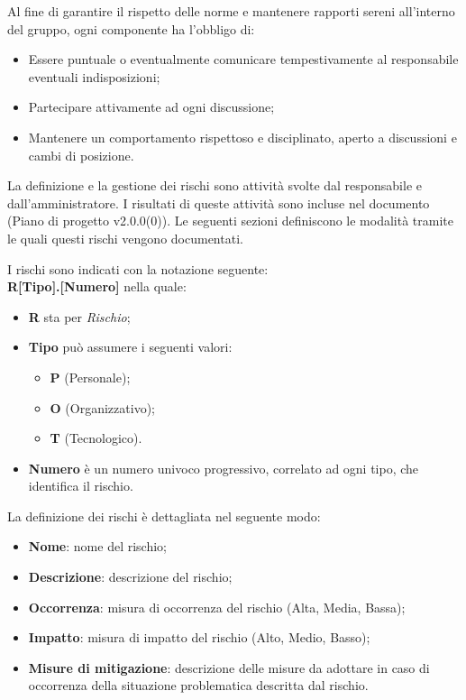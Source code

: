 \documentclass[10pt, a4paper]{article}
\begin{document}
Al fine di garantire il rispetto delle norme e mantenere rapporti sereni all'interno del gruppo, ogni componente ha l'obbligo di:
\begin{itemize}
    \item Essere puntuale o eventualmente comunicare tempestivamente al responsabile eventuali indisposizioni;
    \item Partecipare attivamente ad ogni discussione;
    \item Mantenere un comportamento rispettoso e disciplinato, aperto a discussioni e cambi di posizione.
\end{itemize}

La definizione e la gestione dei rischi sono attività svolte dal responsabile e dall'amministratore.
I risultati di queste attività sono incluse nel documento (Piano di progetto v2.0.0(0)).
Le seguenti sezioni definiscono le modalità tramite le quali questi rischi vengono documentati.

I rischi sono indicati con la notazione seguente:\\
\textbf{R[Tipo].[Numero]}
nella quale:
\begin{itemize}
\item \textbf{R} sta per \textit{Rischio};
\item \textbf{Tipo} può assumere i seguenti valori:
    \begin{itemize}
	\item \textbf{P} (Personale);
	\item \textbf{O} (Organizzativo);
	\item \textbf{T} (Tecnologico).
    \end{itemize}
\item \textbf{Numero} è un numero univoco progressivo, correlato ad ogni tipo, che identifica il rischio.
\end{itemize}

La definizione dei rischi è dettagliata nel seguente modo:
\begin{itemize}
    \item \textbf{Nome}: nome del rischio;
    \item \textbf{Descrizione}: descrizione del rischio;
    \item \textbf{Occorrenza}: misura di occorrenza del rischio (Alta, Media, Bassa);
    \item \textbf{Impatto}: misura di impatto del rischio (Alto, Medio, Basso);
    \item \textbf{Misure di mitigazione}: descrizione delle misure da adottare in caso di occorrenza della situazione problematica descritta dal rischio.
\end{itemize}
\end{document}
